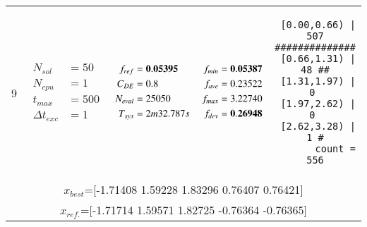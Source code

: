 \begin{table*} [!t]
\begin{tabular}[c]{ccccc}
9
&
{$\!\begin{aligned}
    N_{sol}        &= 50 \\
	N_{cpu}        &= 1 \\
	t_{max}        &= 500 \\
	\Delta t_{exc} &= 1
\end{aligned}$}
&
{$\!\begin{aligned}
	f_{ref} &= {\bf 0.05395} \\
	C_{DE}   &= 0.8 \\
	N_{eval} &= 25050 \\
	T_{sys}  &= 2m32.787s
\end{aligned}$}
&
{$\!\begin{aligned}
    f_{min} &= {\bf 0.05387} \\
    f_{ave} &= 0.23522 \\
    f_{max} &= 3.22740 \\
    f_{dev} &= {\bf 0.26948}
\end{aligned}$}
&
\begin{minipage}{4.1cm} \fontsize{5pt}{6pt}
\begin{verbatim}
 [0.00,0.66) |  507 ##############
 [0.66,1.31) |   48 ##
 [1.31,1.97) |    0 
 [1.97,2.62) |    0 
 [2.62,3.28) |    1 #
       count =  556
 \end{verbatim}
\end{minipage} \\
\multicolumn{5}{c}{{\scriptsize $x_{best}$=[-1.71408 1.59228 1.83296 0.76407 0.76421]}} \\
\multicolumn{5}{c}{{\scriptsize $x_{ref.}$=[-1.71714 1.59571 1.82725 -0.76364 -0.76365]}} \\

\bottomrule


\end{tabular}
\label{tab:one-obj:A}
\end{table*}






